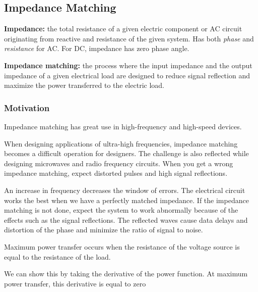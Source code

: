 \subsection{Impedance Matching}

\begin{define}
    \textbf{Impedance:} the total resistance of a given electric component or AC circuit originating from reactive and resistance of the given system. Has both \textit{phase} and \textit{resistance} for AC. For DC, impedance has zero phase angle.

    \textbf{Impedance matching:} the process where the input impedance and the output impedance of a given electrical load are designed to reduce signal reflection and maximize the power transferred to the electric load.
\end{define}

\subsubsection{Motivation}
Impedance matching has great use in high-frequency and high-speed devices. 

When designing applications of ultra-high frequencies, impedance matching becomes a difficult operation for designers. The challenge is also reflected while designing microwaves and radio frequency circuits. When you get a wrong impedance matching, expect distorted pulses and high signal reflections.

An increase in frequency decreases the window of errors. The electrical circuit works the best when we have a perfectly matched impedance. If the impedance matching is not done, expect the system to work abnormally because of the effects such as the signal reflections. The reflected waves cause data delays and distortion of the phase and minimize the ratio of signal to noise.

\begin{concept}
    Maximum power transfer occurs when the resistance of the voltage source is equal to the resistance of the load.
\end{concept}

We can show this by taking the derivative of the power function. At maximum power transfer, this derivative is equal to zero
